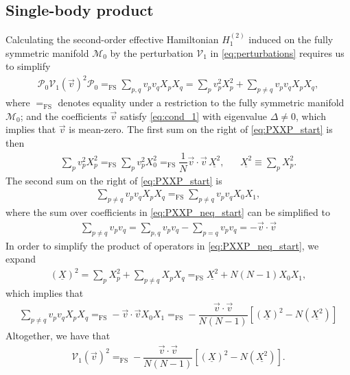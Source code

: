 \documentclass[nofootinbib,notitlepage,11pt]{revtex4-2}
\newcommand{\f}[2]{\dfrac{#1}{#2}} %
\newcommand{\p}[1]{\left(#1\right)} %
\renewcommand{\sp}[1]{\left[#1\right]} %
\renewcommand{\c}{\cdot} %
\renewcommand{\v}{\vec} %
\newcommand{\1}{\mathds{1}}
\newcommand{\M}{\mathcal{M}}
\renewcommand{\P}{\mathcal{P}}
\newcommand{\V}{\mathcal{V}}
\newcommand{\EQFS}{=_{\text{FS}}}
\newcommand{\col}{\underline}
\begin{document}
\subsection{Single-body product}
\label{sec:PXXP}

Calculating the second-order effective Hamiltonian $H_1^{(2)}$ induced
on the fully symmetric manifold $\M_0$ by the perturbation $\V_1$ in
\eqref{eq:perturbations} requires us to simplify
\begin{align}
  \P_0 \V_1\p{\v v}^2 \P_0
  \EQFS \sum_{p,q} v_p v_q X_p X_q
  = \sum_p v_p^2 X_p^2
  + \sum_{p\ne q} v_p v_q X_p X_q,
  \label{eq:PXXP_start}
\end{align}
where $\EQFS$ denotes equality under a restriction to the fully
symmetric manifold $\M_0$; and the coefficients $\v v$ satisfy
\eqref{eq:cond_1} with eigenvalue $\Delta\ne0$, which implies that
$\v v$ is mean-zero.  The first sum on the right of
\eqref{eq:PXXP_start} is then
\begin{align}
  \sum_p v_p^2 X_p^2
  \EQFS \sum_p v_p^2 X_0^2
  \EQFS \f1N \v v\c\v v\, \col{X^2},
  &&
  \col{X^2} \equiv \sum_p X_p^2.
  \label{eq:PXXP_eq}
\end{align}
The second sum on the right of \eqref{eq:PXXP_start} is
\begin{align}
  \sum_{p\ne q} v_p v_q X_p X_q
  \EQFS \sum_{p\ne q} v_p v_q X_0 X_1,
  \label{eq:PXXP_neq_start}
\end{align}
where the sum over coefficients in \eqref{eq:PXXP_neq_start} can be
simplified to
\begin{align}
  \sum_{p\ne q} v_p v_q
  = \sum_{p,q} v_p v_q - \sum_{p=q} v_p v_q
  = - \v v\c\v v
\end{align}
In order to simplify the product of operators in
\eqref{eq:PXXP_neq_start}, we expand
\begin{align}
  \p{\col{X}}^2
  = \sum_p X_p^2 + \sum_{p\ne q} X_p X_q
  \EQFS \col{X^2} + N \p{N-1} X_0 X_1,
  \label{eq:PXXP_neq_ops}
\end{align}
which implies that
\begin{align}
  \sum_{p\ne q} v_p v_q X_p X_q
  \EQFS - \v v\c\v v X_0 X_1
  \EQFS -\f{\v v\c\v v}{N\p{N-1}}
  \sp{\p{\col{X}}^2 - N \p{\col{X^2}}}
  \label{eq:PXXP_neq}
\end{align}
Altogether, we have that
\begin{align}
  \V_1\p{\v v}^2
  \EQFS -\f{\v v\c\v v}{N\p{N-1}} \sp{\p{\col{X}}^2 - N \p{\col{X^2}}}.
\end{align}
\end{document}
